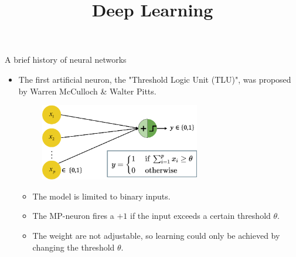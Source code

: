 




\newcommand{\titlefigure}{figure/rosenblatt_perceptron.jpg}
\newcommand{\learninggoals}{
  \item Predecessors of modern (deep) neural networks
  \item History of DL as a field
}

\title{Deep Learning}
\date{}




\begin{vbframe}{A brief history of neural networks}
\begin{itemize}
\item {} The first artificial neuron, the "Threshold Logic Unit (TLU)", was proposed by Warren McCulloch \& Walter Pitts.
\begin{figure}
\includegraphics[width=7cm]{figure/mp_neuron.png}
\end{figure}
\begin{itemize}
\item The model is limited to binary inputs.
\vspace{2mm}
\item The MP-neuron fires a $+1$ if the input exceeds a certain threshold $\theta$.
\vspace{2mm}
\item The weight are not adjustable, so learning could only be achieved by changing the threshold $\theta$.
\end{itemize}
\end{itemize}
\framebreak


\end{vbframe}
